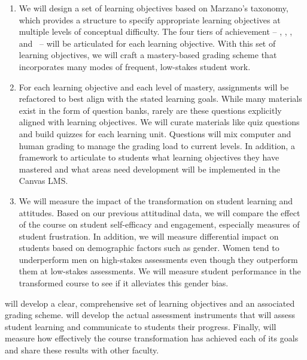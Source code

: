 \documentclass[10pt,letterpaper]{article}
\begin{document}
\begin{enumerate}[nosep,label=\textbf{\arabic*}.]
\item {} 
We will design a set of learning objectives  based on Marzano's taxonomy, which provides a structure to specify appropriate learning objectives at multiple levels of conceptual difficulty. The four tiers of achievement -- \recall, \comprehension, \analysis, and \use\ -- will be articulated for each learning objective. With this set of learning objectives, we will craft a mastery-based grading scheme that incorporates many modes of frequent, low-stakes student work.%

\item {}
For each learning objective and each level of mastery, assignments will be refactored to best align with the stated learning goals. While many materials exist in the form of question banks, rarely are these questions explicitly aligned with learning objectives. We will curate materials like quiz questions and build quizzes for each learning unit. Questions will mix computer and human grading to manage the grading load to current levels. In addition,  a framework to articulate to students what learning objectives they have mastered and what areas need development will be implemented in the Canvas LMS.

\item {}
We will measure the impact of the transformation on student learning and attitudes. Based on our previous attitudinal data, we will compare the effect of the course on student self-efficacy and engagement, especially measures of student frustration. In addition, we will measure differential impact on students based on demographic factors such as gender. Women tend to underperform men on high-stakes assessments even though they outperform them at low-stakes assessments. We will measure student performance in the transformed course to see if it alleviates this gender bias.
\end{enumerate}
 will develop a clear, comprehensive set of learning objectives and an associated grading scheme. 
 will develop the actual assessment instruments that will assess student learning and communicate to students their progress. Finally,  will measure how effectively the course transformation has achieved each of its goals and share these results with other faculty.
\end{document}

